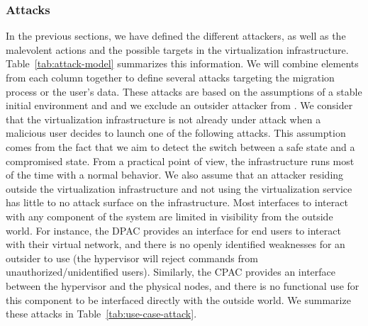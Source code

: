 \subsubsection{Attacks}
\label{sec:model-attacks}
In the previous sections, we have defined the different attackers, as well as the malevolent actions and the possible targets in the virtualization infrastructure. 
Table~\ref{tab:attack-model} summarizes this information.
We will combine elements from each column together to define several attacks targeting the migration process or the user's data.
These attacks are based on the assumptions of a stable initial environment and and we exclude an outsider attacker from .
We consider that the virtualization infrastructure is not already under attack when a malicious user decides to launch one of the following attacks.
This assumption comes from the fact that we aim to detect the switch between a safe state and a compromised state. From a practical point of view, the infrastructure runs most of the time with a normal behavior.
We also assume that an attacker residing outside the virtualization infrastructure and not using the virtualization service has little to no attack surface on the infrastructure.
Most interfaces to interact with any component of the system are limited in visibility from the outside world.
For instance, the DPAC provides an interface for end users to interact with their virtual network, and there is no openly identified weaknesses for an outsider to use (\ie the hypervisor will reject commands from unauthorized/unidentified users).
Similarly, the CPAC provides an interface between the hypervisor and the physical nodes, and there is no functional use for this component to be interfaced directly with the outside world.
We summarize these attacks in Table~\ref{tab:use-case-attack}.

